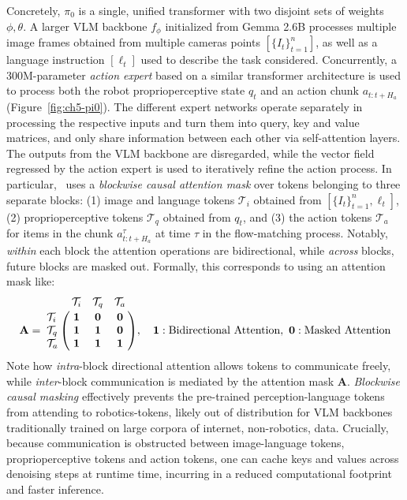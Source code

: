 Concretely, \( \pi_0 \) is a single, unified transformer with two disjoint sets of weights \( \phi, \theta\). 
A larger VLM backbone \( f_\phi \) initialized from Gemma 2.6B processes multiple image frames obtained from multiple cameras points \( [\{ I_t \}_{t=1}^n] \), as well as a language instruction \([\ell_t]\) used to describe the task considered.
Concurrently, a 300M-parameter \emph{action expert} based on a similar transformer architecture is used to process both the robot proprioperceptive state \(q_t\) and an action chunk \(a_{t:t+H_a}\) (Figure~\ref{fig:ch5-pi0}).
The different expert networks operate separately in processing the respective inputs and turn them into query, key and value matrices, and only share information between each other via self-attention layers.
The outputs from the VLM backbone are disregarded, while the vector field regressed by the action expert is used to iteratively refine the action process.
In particular, \pizero~uses a \emph{blockwise causal attention mask} over tokens belonging to three separate blocks: (1) image and language tokens \(\mathcal T_i \)  obtained from \([\{ I_t \}_{t=1}^n, \ell_t]\), (2) proprioperceptive tokens \(\mathcal T_q \) obtained from \(q_t\), and (3) the action tokens \( \mathcal T_a \) for items in the chunk \(a^{\tau}_{t:t+H_a}\) at time \( \tau \) in the flow-matching process.
Notably, \emph{within} each block the attention operations are bidirectional, while \emph{across} blocks, future blocks are masked out.
Formally, this corresponds to using an attention mask like:
\begin{equation*}
    \mathbf{A} =
    \bordermatrix{
              & \mathcal{T}_i & \mathcal{T}_q & \mathcal{T}_a \cr
    \mathcal{T}_i & \mathbf{1} & \mathbf{0} & \mathbf{0} \cr
    \mathcal{T}_q & \mathbf{1} & \mathbf{1} & \mathbf{0} \cr
    \mathcal{T}_a & \mathbf{1} & \mathbf{1} & \mathbf{1} \cr
    },
    \quad \mathbf{1}: \text{Bidirectional Attention}, \ \mathbf{0}: \text{Masked Attention} 
\end{equation*}
Note how \emph{intra}-block directional attention allows tokens to communicate freely, while \emph{inter}-block communication is mediated by the attention mask \(\mathbf{A} \).
\emph{Blockwise causal masking} effectively prevents the pre-trained perception-language tokens from attending to robotics-tokens, likely out of distribution for VLM backbones traditionally trained on large corpora of internet, non-robotics, data.
Crucially, because communication is obstructed between image-language tokens, proprioperceptive tokens and action tokens, one can cache keys and values across denoising steps at runtime time, incurring in a reduced computational footprint and faster inference.

